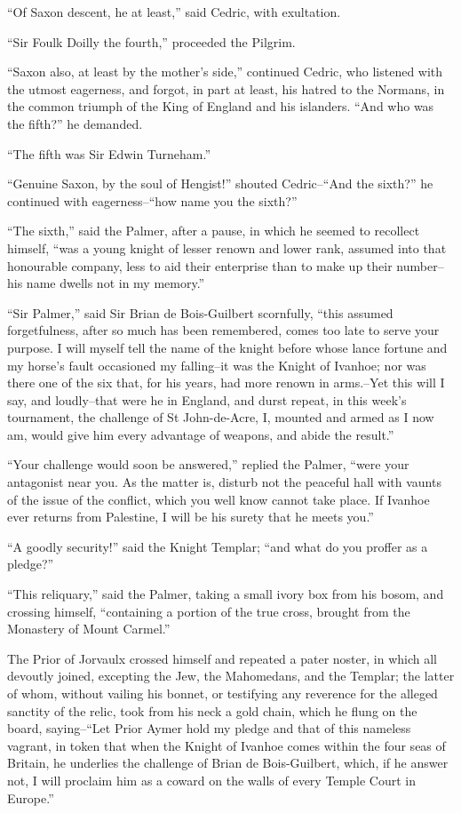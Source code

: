 ``Of Saxon descent, he at least,'' said Cedric, with exultation.

``Sir Foulk Doilly the fourth,'' proceeded the Pilgrim.

``Saxon also, at least by the mother's side,'' continued Cedric, who
listened with the utmost eagerness, and forgot, in part at least, his
hatred to the Normans, in the common triumph of the King of England and
his islanders. ``And who was the fifth?'' he demanded.

``The fifth was Sir Edwin Turneham.''

``Genuine Saxon, by the soul of Hengist!'' shouted Cedric--``And the
sixth?'' he continued with eagerness--``how name you the sixth?''

``The sixth,'' said the Palmer, after a pause, in which he seemed to
recollect himself, ``was a young knight of lesser renown and lower rank,
assumed into that honourable company, less to aid their enterprise than
to make up their number--his name dwells not in my memory.''

``Sir Palmer,'' said Sir Brian de Bois-Guilbert scornfully, ``this
assumed forgetfulness, after so much has been remembered, comes too late
to serve your purpose. I will myself tell the name of the knight before
whose lance fortune and my horse's fault occasioned my falling--it was
the Knight of Ivanhoe; nor was there one of the six that, for his years,
had more renown in arms.--Yet this will I say, and loudly--that were he
in England, and durst repeat, in this week's tournament, the challenge
of St John-de-Acre, I, mounted and armed as I now am, would give him
every advantage of weapons, and abide the result.''

``Your challenge would soon be answered,'' replied the Palmer, ``were
your antagonist near you. As the matter is, disturb not the peaceful
hall with vaunts of the issue of the conflict, which you well know
cannot take place. If Ivanhoe ever returns from Palestine, I will be his
surety that he meets you.''

``A goodly security!'' said the Knight Templar; ``and what do you
proffer as a pledge?''

``This reliquary,'' said the Palmer, taking a small ivory box from his
bosom, and crossing himself, ``containing a portion of the true cross,
brought from the Monastery of Mount Carmel.''

The Prior of Jorvaulx crossed himself and repeated a pater noster, in
which all devoutly joined, excepting the Jew, the Mahomedans, and the
Templar; the latter of whom, without vailing his bonnet, or testifying
any reverence for the alleged sanctity of the relic, took from his neck
a gold chain, which he flung on the board, saying--``Let Prior Aymer
hold my pledge and that of this nameless vagrant, in token that when the
Knight of Ivanhoe comes within the four seas of Britain, he underlies
the challenge of Brian de Bois-Guilbert, which, if he answer not, I will
proclaim him as a coward on the walls of every Temple Court in Europe.''

